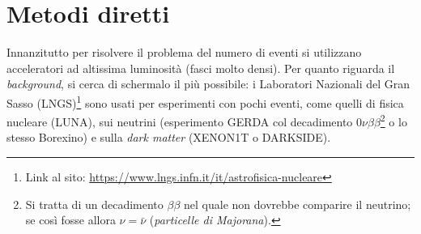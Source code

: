 \section{Metodi diretti}
Innanzitutto per risolvere il problema del numero di eventi si utilizzano acceleratori ad altissima luminosità (fasci molto densi). Per quanto riguarda il \textit{background}, si cerca di schermalo il più possibile: i Laboratori Nazionali del Gran Sasso (LNGS)\footnote{Link al sito: \url{https://www.lngs.infn.it/it/astrofisica-nucleare}} sono usati per esperimenti con pochi eventi, come quelli di fisica nucleare (LUNA), sui neutrini (esperimento GERDA col decadimento $0\nu\beta\beta$\footnote{Si tratta di un decadimento $\beta\beta$ nel quale non dovrebbe comparire il neutrino; se così fosse allora $\nu=\bar{\nu}$ (\textit{particelle di Majorana}).} o lo stesso Borexino) e sulla \textit{dark matter} (XENON1T o DARKSIDE).

